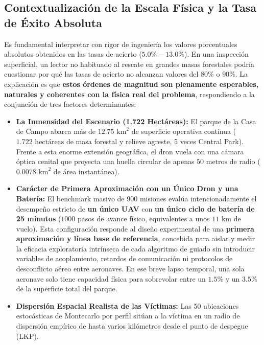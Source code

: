 \subsection{Contextualización de la Escala Física y la Tasa de Éxito Absoluta}

Es fundamental interpretar con rigor de ingeniería los valores porcentuales absolutos obtenidos en las tasas de acierto ($5.0\% - 13.0\%$). En una inspección superficial, un lector no habituado al rescate en grandes masas forestales podría cuestionar por qué las tasas de acierto no alcanzan valores del $80\%$ o $90\%$. La explicación es que \textbf{estos órdenes de magnitud son plenamente esperables, naturales y coherentes con la física real del problema}, respondiendo a la conjunción de tres factores determinantes:

\begin{itemize}
    \item \textbf{La Inmensidad del Escenario (1.722 Hectáreas):} El parque de la Casa de Campo abarca más de $12.75\text{ km}^2$ de superficie operativa continua ($1.722\text{ hectáreas}$ de masa forestal y relieve agreste, 5 veces Central Park). Frente a esta enorme extensión geográfica, el dron vuela con una cámara óptica cenital que proyecta una huella circular de apenas $50\text{ metros}$ de radio ($0.0078\text{ km}^2$ de área instantánea).
    \item \textbf{Carácter de Primera Aproximación con un Único Dron y una Batería:} El benchmark masivo de 900 misiones evalúa intencionadamente el desempeño estricto de \textbf{un único UAV} con \textbf{un único ciclo de batería de 25 minutos} ($1000$ pasos de avance físico, equivalentes a unos $11\text{ km}$ de vuelo). Esta configuración responde al diseño experimental de una \textbf{primera aproximación y línea base de referencia}, concebida para aislar y medir la eficacia exploratoria intrínseca de cada algoritmo de guiado sin introducir variables de acoplamiento, retardos de comunicación ni protocolos de desconflicto aéreo entre aeronaves. En ese breve lapso temporal, una sola aeronave solo tiene capacidad física para sobrevolar entre un $1.5\%$ y un $3.5\%$ de la superficie total del parque.
    \item \textbf{Dispersión Espacial Realista de las Víctimas:} Las 50 ubicaciones estocásticas de Montecarlo por perfil sitúan a la víctima en un radio de dispersión empírico de hasta varios kilómetros desde el punto de despegue (LKP).
\end{itemize}

